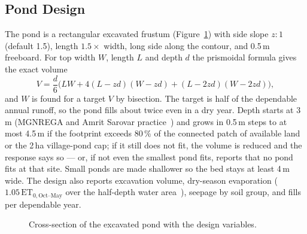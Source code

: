 \documentclass[manuscript,screen,review]{acmart}
\begin{document}
\subsection{Pond Design}
The pond is a rectangular excavated frustum (Figure~\ref{fig:section}) with side slope
$z{:}1$ (default 1.5), length $1.5\times$ width, long side along the contour, and 0.5\,m
freeboard. For top width $W$, length $L$ and depth $d$ the prismoidal formula gives the exact
volume
\begin{equation}
V=\frac{d}{6}\Big(LW + 4(L-zd)(W-zd) + (L-2zd)(W-2zd)\Big),
\end{equation}
and $W$ is found for a target $V$ by bisection. The target is half of the dependable annual
runoff, so the pond fills about twice even in a dry year. Depth starts at 3\,m (MGNREGA and
Amrit Sarovar practice~\cite{amritsarovar}) and grows in 0.5\,m steps to at most 4.5\,m if the
footprint exceeds 80\,\% of the connected patch of available land or the 2\,ha village-pond
cap; if it still does not fit, the volume is reduced and the response says so --- or, if not
even the smallest pond fits, reports that no pond fits at that site. Small ponds are made
shallower so the bed stays at least 4\,m wide. The design also reports excavation volume,
dry-season evaporation ($1.05\,\mathrm{ET}_{0,\text{Oct--May}}$ over the half-depth water
area~\cite{allen1998}), seepage by soil group, and fills per dependable year.

\begin{figure}[h]
  \centering
{}
  \caption{Cross-section of the excavated pond with the design variables.}
  \label{fig:section}
\end{figure}
\end{document}
